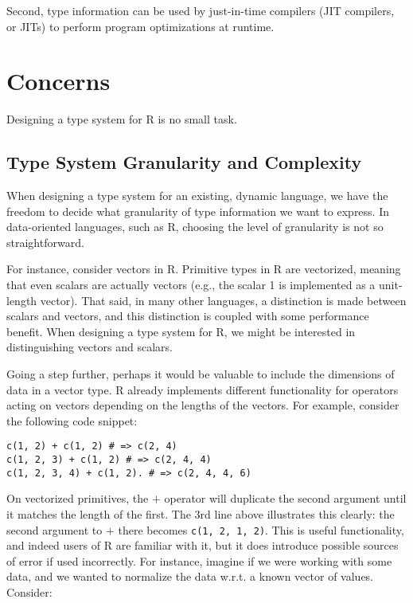 \documentclass[sigplan,10pt,review,anonymous]{acmart}\settopmatter{printfolios=true,printccs=false,printacmref=false}
\begin{document}
Second, type information can be used by just-in-time compilers (JIT compilers, or JITs) to perform program optimizations at runtime.

%
%
%
%
\section{Concerns}

Designing a type system for R is no small task.

%
%
\subsection{Type System Granularity and Complexity}

When designing a type system for an existing, dynamic language, we have the freedom to decide what granularity of type information we want to express.
In data-oriented languages, such as R, choosing the level of granularity is not so straightforward.

For instance, consider vectors in R.
Primitive types in R are vectorized, meaning that even scalars are actually vectors (e.g., the scalar 1 is implemented as a unit-length vector).
That said, in many other languages, a distinction is made between scalars and vectors, and this distinction is coupled with some performance benefit.
When designing a type system for R, we might be interested in distinguishing vectors and scalars.

Going a step further, perhaps it would be valuable to include the dimensions of data in a vector type.
R already implements different functionality for operators acting on vectors depending on the lengths of the vectors.
For example, consider the following code snippet:

\begin{lstlisting}
c(1, 2) + c(1, 2) # => c(2, 4)
c(1, 2, 3) + c(1, 2) # => c(2, 4, 4)
c(1, 2, 3, 4) + c(1, 2). # => c(2, 4, 4, 6)
\end{lstlisting}

On vectorized primitives, the $+$ operator will duplicate the second argument until it matches the length of the first.
The 3rd line above illustrates this clearly: the second argument to $+$ there becomes {\tt c(1, 2, 1, 2)}.
This is useful functionality, and indeed users of R are familiar with it, but it does introduce possible sources of error if used incorrectly.
For instance, imagine if we were working with some data, and we wanted to normalize the data w.r.t. a known vector of values.
Consider:
\end{document}
